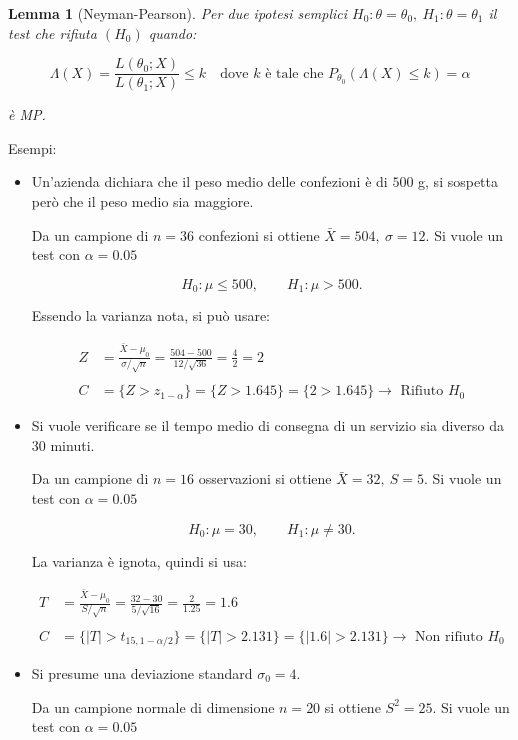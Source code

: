 \documentclass{article}
\newtheorem{lemma}{Lemma}
\begin{document}
\begin{lemma}[Neyman-Pearson]
Per  due ipotesi semplici $H_0:\theta=\theta_0,\ H_1:\theta=\theta_1$ il test che rifiuta $(H_0)$ quando:

\[
\Lambda(X)=\frac{L(\theta_0;X)}{L(\theta_1;X)}\leq k\quad
\text{dove $k$ è  tale che }
P_{\theta_0}(\Lambda(X)\leq k)=\alpha
\]

è MP.\newline
\end{lemma}

Esempi:
\begin{itemize}
    \item Un'azienda dichiara che il peso medio delle confezioni è di $500$ g, si sospetta però che il peso medio sia maggiore.

    
Da un campione di $n=36$ confezioni si ottiene $
\bar X=504,\ \sigma=12$. Si vuole un test con $\alpha=0.05$

\[
H_0:\mu\leq500,
\qquad
H_1:\mu>500.
\]

Essendo la varianza nota, si può usare:

\begin{align*}
Z&=\frac{\bar X-\mu_0}{\sigma/\sqrt n}=\frac{504-500}{12/\sqrt{36}}
=
\frac{4}{2}
=
2 \\
\\
C&=\{Z>z_{1-\alpha}\}=\{Z>1.645\}=\{2>1.645\}\rightarrow\text{ Rifiuto }H_0
\end{align*}

\item Si vuole verificare se il tempo medio di consegna di un servizio sia diverso
da $30$ minuti.

Da un campione di $n=16$ osservazioni si ottiene $\bar X=32,\
S=5$. Si vuole un test con $\alpha=0.05$

\[
H_0:\mu=30,
\qquad
H_1:\mu\neq30.
\]

La varianza è ignota, quindi si usa:

\begin{align*}
T&=\frac{\bar X-\mu_0}{S/\sqrt n}=
\frac{32-30}{5/\sqrt{16}}
=
\frac{2}{1.25}
=
1.6
\\\\
C&=
\{|T|>t_{15,1-\alpha/2}\}=\{|T|>2.131\}=\{|1.6|>2.131\}\rightarrow\text{ Non rifiuto }H_0
\end{align*}

\item Si presume una deviazione standard $\sigma_0=4$.


Da un campione normale di dimensione $n=20$ si ottiene $S^2=25$. Si vuole un test con $\alpha=0.05$


\end{itemize}
\end{document}
